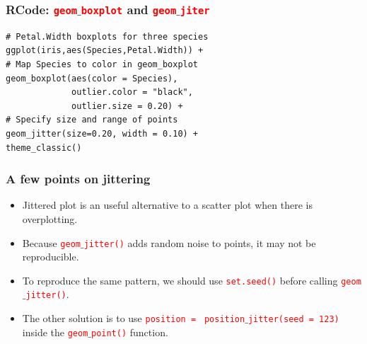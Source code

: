 \documentclass{beamer}
\begin{document}
\begin{frame}[fragile]\frametitle{RCode: \textcolor{red}{\texttt{geom}}$\_$\textcolor{red}{\texttt{boxplot}} and \textcolor{red}{\texttt{geom}}$\_$\textcolor{red}{\texttt{jiter}}}
\begin{lstlisting}
# Petal.Width boxplots for three species
ggplot(iris,aes(Species,Petal.Width)) +
# Map Species to color in geom_boxplot
geom_boxplot(aes(color = Species), 
             outlier.color = "black",
             outlier.size = 0.20) +
# Specify size and range of points
geom_jitter(size=0.20, width = 0.10) +
theme_classic()
\end{lstlisting}
\end{frame}

\begin{frame}\frametitle{A  few points on jittering}
\begin{itemize}
\item Jittered plot is an useful alternative to a scatter plot when there is overplotting.
\vspace{0.2in}

\item Because \textcolor{red}{\texttt{geom}}$\_$\textcolor{red}{\texttt{jitter()}} adds random noise to points, it may not be reproducible.

\vspace{0.2in}

\item To reproduce the same pattern, we should use \textcolor{red}{\texttt{set.seed()}} before calling \textcolor{red}{\texttt{geom}}$\_$\textcolor{red}{\texttt{jitter()}}.

\vspace{0.2in}

\item The other solution is to use \textcolor{red}{\texttt{position = }} \textcolor{red}{\texttt{position}}$\_$\textcolor{red}{\texttt{jitter(seed = 123)}} inside the \textcolor{red}{\texttt{geom}}$\_$\textcolor{red}{\texttt{point()}} function.
\end{itemize}
\end{frame}
\end{document}
